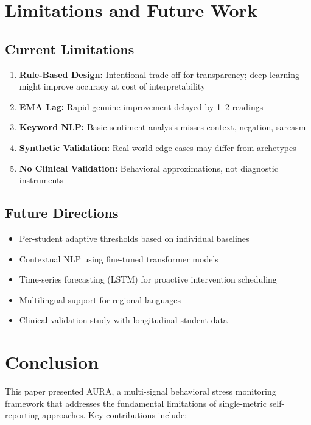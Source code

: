 \documentclass[journal]{IEEEtran}
\begin{document}
\section{Limitations and Future Work}
\label{sec:limitations}

\subsection{Current Limitations}

\begin{enumerate}
    \item \textbf{Rule-Based Design:} Intentional trade-off for transparency; deep learning might improve accuracy at cost of interpretability
    \item \textbf{EMA Lag:} Rapid genuine improvement delayed by 1--2 readings
    \item \textbf{Keyword NLP:} Basic sentiment analysis misses context, negation, sarcasm
    \item \textbf{Synthetic Validation:} Real-world edge cases may differ from archetypes
    \item \textbf{No Clinical Validation:} Behavioral approximations, not diagnostic instruments
\end{enumerate}

\subsection{Future Directions}

\begin{itemize}
    \item Per-student adaptive thresholds based on individual baselines
    \item Contextual NLP using fine-tuned transformer models
    \item Time-series forecasting (LSTM) for proactive intervention scheduling
    \item Multilingual support for regional languages
    \item Clinical validation study with longitudinal student data
\end{itemize}

\section{Conclusion}
\label{sec:conclusion}

This paper presented AURA, a multi-signal behavioral stress monitoring framework that addresses the fundamental limitations of single-metric self-reporting approaches. Key contributions include:
\end{document}
